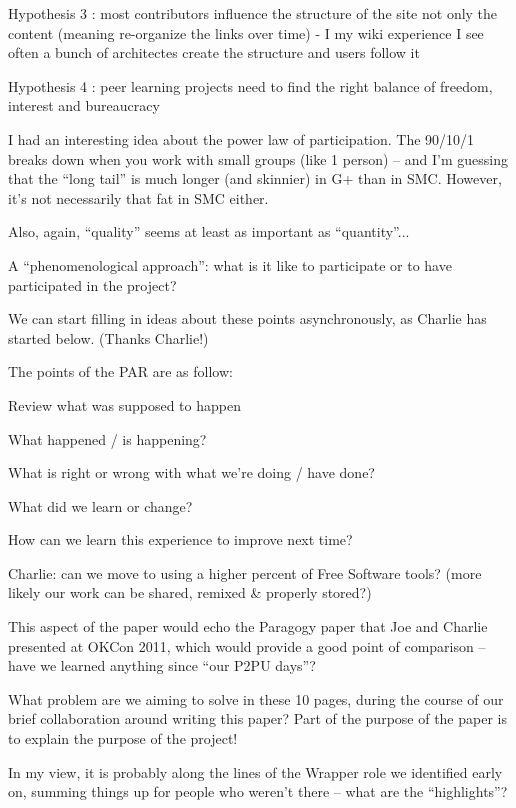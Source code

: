 \documentclass{acm_proc_article-sp}
\begin{document}
                Hypothesis 3 : most contributors influence the structure of the site not only the content (meaning re-organize the links over time) - I my wiki experience I see often a bunch of architectes create the structure and users follow it

                Hypothesis 4 : peer learning projects need to find the right balance of freedom, interest and bureaucracy

        I had an interesting idea about the power law of participation. The 90/10/1 breaks down when you work with small groups (like 1 person) -- and I'm guessing that the ``long tail'' is much longer (and skinnier) in G+ than in SMC. However, it's not necessarily that fat in SMC either.

        Also, again, ``quality'' seems at least as important as ``quantity''... 

    A ``phenomenological approach'': what is it like to participate or to have participated in the project?


            We can start filling in ideas about these points asynchronously, as Charlie has started below. (Thanks Charlie!)

        The points of the PAR are as follow:

            Review what was supposed to happen

            What happened / is happening?

            What is right or wrong with what we're doing / have done?

            What did we learn or change?

            How can we learn this experience to improve next time?

                Charlie: can we move to using a higher percent of Free Software tools? (more likely our work can be shared, remixed \& properly stored?)

        This aspect of the paper would echo the Paragogy paper that Joe and Charlie presented at OKCon 2011, which would provide a good point of comparison -- have we learned anything since ``our P2PU days''?

What problem are we aiming to solve in these 10 pages, during the
course of our brief collaboration around writing this paper? Part of
the purpose of the paper is to explain the purpose of the project!

In my view, it is probably along the lines of the Wrapper role we
identified early on, summing things up for people who weren't there --
what are the ``highlights''?
\end{document}
